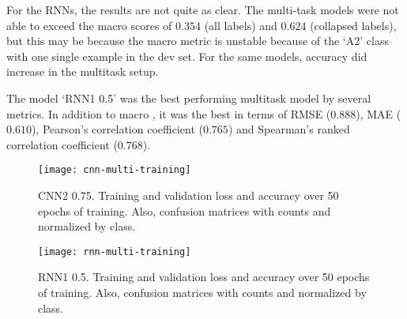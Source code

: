For the RNNs, the results are not quite as clear. The multi-task models were
not able to exceed the macro \FI scores of $0.354$ (all labels) and $0.624$
(collapsed labels), but this may be because the macro \FI metric is unstable
because of the `A2' class with one single example in the dev set. For the
same models, accuracy did increase in the multitask setup.

The model `RNN1 0.5' was the best performing multitask model by several
metrics. In addition to macro \FI, it was the best in terms of RMSE
($0.888$), MAE ($0.610$), Pearson's correlation coefficient ($0.765$) and
Spearman's ranked correlation coefficient ($0.768$).


\begin{figure}
  \centering
  \texttt{[image: cnn-multi-training]}
  \caption{CNN2 0.75. Training and validation loss and accuracy over 50 epochs of training.
           Also, confusion matrices with counts and normalized by class.}
  \label{fig:cnn-multi-training}
\end{figure}


\begin{figure}
  \centering
  \texttt{[image: rnn-multi-training]}
  \caption{RNN1 0.5. Training and validation loss and accuracy over 50 epochs of training.
           Also, confusion matrices with counts and normalized by class.}
  \label{fig:rnn-multi-training}
\end{figure}
